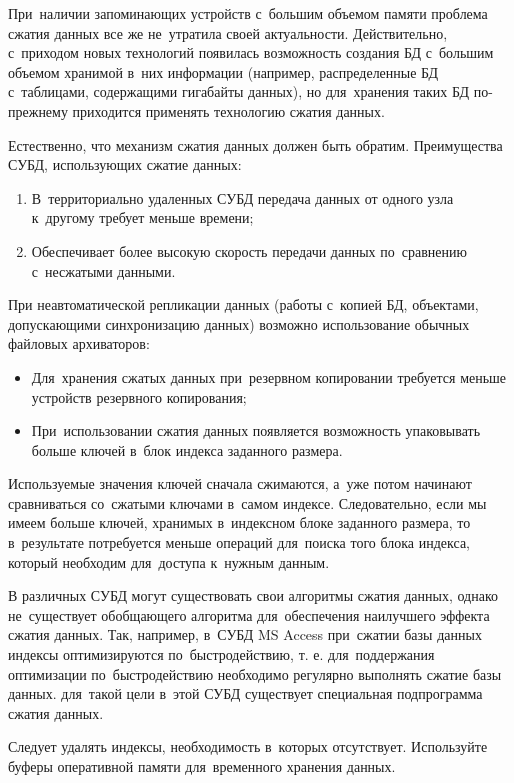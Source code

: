 \documentclass{ou}
\begin{document}
При~наличии запоминающих устройств с~большим объемом памяти проблема сжатия данных все же не~утратила своей актуальности. Действительно, с~приходом новых технологий появилась возможность создания БД с~большим объемом хранимой в~них информации (например, распределенные БД с~таблицами, содержащими гигабайты данных), но для~хранения таких БД по-прежнему приходится применять технологию сжатия данных\cite{Senchenko2015}.

Естественно, что механизм сжатия данных должен быть обратим. Преимущества СУБД, использующих сжатие данных:
\begin{enumerate}[leftmargin=0em, itemindent=3.75em, nosep, label=\arabic*)]
\item В~территориально удаленных СУБД передача данных от одного узла к~другому требует меньше времени;
\item Обеспечивает более высокую скорость передачи данных по~сравнению с~несжатыми данными.
\end{enumerate}

При неавтоматической репликации данных (работы с~копией БД, объектами, допускающими синхронизацию данных) возможно использование обычных файловых архиваторов:
\begin{itemize}[label=-, leftmargin=0em, itemindent=3.35em, nosep]
\item Для~хранения сжатых данных при~резервном копировании требуется меньше устройств резервного копирования;
\item При~использовании сжатия данных появляется возможность упаковывать больше ключей в~блок индекса заданного размера.
\end{itemize}

Используемые значения ключей сначала сжимаются, а~уже потом начинают сравниваться со~сжатыми ключами в~самом индексе. Следовательно, если мы имеем больше ключей, хранимых в~индексном блоке заданного размера, то в~результате потребуется меньше операций для~поиска того блока индекса, который необходим для~доступа к~нужным данным.

В различных СУБД могут существовать свои алгоритмы сжатия данных, однако не~существует обобщающего алгоритма для~обеспечения наилучшего эффекта сжатия данных. Так, например, в~СУБД MS Access при~сжатии базы данных индексы оптимизируются по~быстродействию, т. е. для~поддержания оптимизации по~быстродействию необходимо регулярно выполнять сжатие базы данных. для~такой цели в~этой СУБД существует специальная подпрограмма сжатия данных.

Следует удалять индексы, необходимость в~которых отсутствует. Используйте буферы оперативной памяти для~временного хранения данных.
\end{document}
